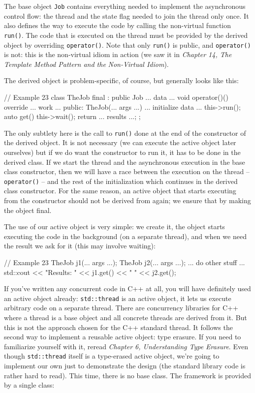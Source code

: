 The base object \texttt{Job} contains everything needed to implement the asynchronous control flow: the thread and the state flag needed to join the thread only once. It also defines the way to execute the code by calling the non-virtual function \texttt{run()}. The code that is executed on the thread must be provided by the derived object by overriding \texttt{operator()}. Note that only \texttt{run()} is public, and \texttt{operator()} is not: this is the non-virtual idiom in action (we saw it in \emph{Chapter 14, The Template Method Pattern and the} \emph{Non-Virtual Idiom}).

The derived object is problem-specific, of course, but generally looks like this:

\begin{code}
// Example 23
class TheJob final : public Job {
  ... data ...
  void operator()() override { ... work ... }
  public:
  TheJob(... args ...) {
    ... initialize data ...
    this->run();
  }
  auto get() { this->wait(); return ... results ...; }
};
\end{code}

The only subtlety here is the call to \texttt{run()} done at the end of the constructor of the derived object. It is not necessary (we can execute the active object later ourselves) but if we do want the constructor to run it, it has to be done in the derived class. If we start the thread and the asynchronous execution in the base class constructor, then we will have a race between the execution on the thread -- \texttt{operator()} -- and the rest of the initialization which continues in the derived class constructor. For the same reason, an active object that starts executing from the constructor should not be derived from again; we ensure that by making the object final.

The use of our active object is very simple: we create it, the object starts executing the code in the background (on a separate thread), and when we need the result we ask for it (this may involve waiting):

\begin{code}
// Example 23
TheJob j1(... args ...);
TheJob j2(... args ...);
... do other stuff ...
std::cout << "Results: " << j1.get() << " " << j2.get();
\end{code}

If you've written any concurrent code in C++ at all, you will have definitely used an active object already: \texttt{std::thread} is an active object, it lets us execute arbitrary code on a separate thread. There are concurrency libraries for C++ where a thread is a base object and all concrete threads are derived from it. But this is not the approach chosen for the C++ standard thread. It follows the second way to implement a reusable active object: type erasure. If you need to familiarize yourself with it, reread \emph{Chapter 6, Understanding Type Erasure}. Even though \texttt{std::thread} itself is a type-erased active object, we're going to implement our own just to demonstrate the design (the standard library code is rather hard to read). This time, there is no base class. The framework is provided by a single class:

